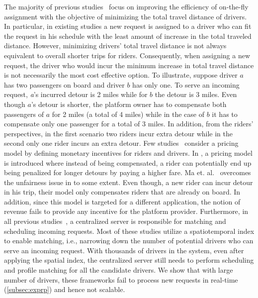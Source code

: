 The majority of previous studies~\cite{Ota15, Cici15, Cao15, PelzerITS15} focus on improving the efficiency of on-the-fly assignment with the objective of minimizing the total travel distance of drivers. In particular, in existing studies a new request is assigned to a driver who can fit the request in his schedule with the least amount of increase in the total traveled distance. However, minimizing drivers' total travel distance is not always equivalent to overall shorter trips for riders. Consequently, when assigning a new request, the driver who would incur the minimum increase in total travel distance is not necessarily the most cost effective option. To illustrate, suppose driver $a$ has two passengers on board and driver $b$ has only one. To serve an incoming request, \textit{a}'s incurred detour is 2 miles while for $b$ the detour is 3 miles. Even though $a$'s detour is shorter, the platform owner has to compensate both passengers of $a$ for 2 miles (a total of 4 miles) while in the case of $b$ it has to compensate only one passenger for a total of $3$ miles. In addition, from the riders' perspectives, in the first scenario two riders incur extra detour while in the second only one rider incurs an extra detour.  Few studies~\cite{Ma13,Ma15} consider a pricing model by defining monetary incentives for riders and drivers. In \cite{Ma13}, a pricing model is introduced where instead of being compensated, a rider can potentially end up being penalized for longer detours by paying a higher fare. Ma et. al.~\cite{Ma15} overcomes the unfairness issue in \cite{Ma13} to some extent. Even though, a new rider can incur detour in his trip, their model only compensates riders that are already on board. In addition, since this model is targeted for a different application, the notion of revenue fails to provide any incentive for the platform provider. Furthermore, in all previous studies~\cite{Ma13,Huang14,Ma15}, a centralized server is responsible for matching and scheduling incoming requests. Most of these studies utilize a spatiotemporal index to enable matching, i.e., narrowing down the number of potential drivers who can serve an incoming request. With thousands of drivers in the system, even after applying the spatial index, the centralized server still needs to perform scheduling and profile matching for all the candidate drivers. We show that with large number of drivers, these frameworks fail to process new requests in real-time (\cref{subsec:exprp}) and hence not scalable.


